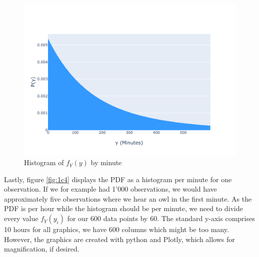 \begin{figure}[h]
\centering
\includegraphics[width=17cm]{pics/1c4.pdf}
\caption{Histogram of $f_Y(y)$ by minute}
\label{fig:1c4}
\end{figure}
\FloatBarrier

Lastly, figure \eqref{fig:1c4} displays the PDF as a histogram per minute for one observation. If we for example had 1'000 observations, we would have approximately five observations where we hear an owl in the first minute. As the PDF is per hour while the histogram should be per minute, we need to divide every value $f_Y(y_i)$ for our 600 data points by 60. The standard y-axis comprises 10 hours for all graphics, we have 600 columns which might be too many. However, the graphics are created with python and Plotly, which allows for magnification, if desired. 

